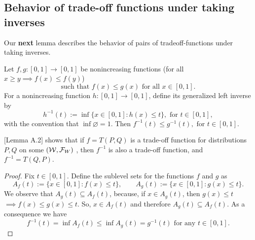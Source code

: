 \subsection{Behavior of  trade-off functions under taking inverses}\label{sec:prelimTOFI}
Our \textbf{next} lemma describes the  behavior of pairs of  tradeoff-functions under taking inverses.
\begin{lemma}\label{lem:ITOF}
Let \(f,g:[0,1]\to[0,1]\) be nonincreasing functions (for all $x\geq y \implies f(x) \leq f(y)$) 
\[
  \text{such that }  f(x)\leq g(x) \text{ for all } x\in[0,1].
\]
For a nonincreasing function \(h:[0,1]\to[0,1]\), define its generalized left inverse by
\[
    h^{-1}(t)
    :=
    \inf\{x\in[0,1]: h(x)\leq t\},
    \text{ for } t\in[0,1],
\]
with the convention that \(\inf\varnothing=1\). Then
$  f^{-1}(t)\leq g^{-1}(t),
    \text{ for } t\in[0,1].$
\end{lemma}
\begin{remark} \label{rem:ITOF}
    \citet{dong2022gaussian}[Lemma A.2] shows that if $f=T(P,Q)$ is a trade-off function for distributions $P,Q$ on some $(\mathcal{W}, \mathcal{F}_W)$ , then $f^{-1}$ is also a trade-off function, and $f^{-1}= T(Q,P)$.
\end{remark}
\begin{proof}
Fix \(t\in[0,1]\). Define the sublevel sets for the functions $f$ and $g$ as
\[
    A_f(t):=\{x\in[0,1]: f(x)\leq t\},
    \qquad
    A_g(t):=\{x\in[0,1]: g(x)\leq t\}.
\]
We observe that $A_g(t)\subseteq A_f(t)$, because, if \(x\in A_g(t)\), then \(g(x)\leq t\) $\implies  f(x)\leq g(x)\leq t$. So, \(x\in A_f(t)\) and therefore \(A_g(t)\subseteq A_f(t)\). As a consequence we have 
\[
     f^{-1}(t)= \inf A_f(t)\leq \inf A_g(t)= g^{-1}(t) \text{ for any } t\in[0,1].
\]
\end{proof}
